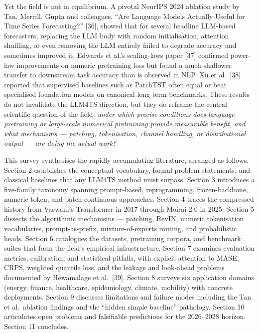 \documentclass{article}
\begin{document}
Yet the field is not in equilibrium. A pivotal NeurIPS 2024 ablation study by Tan, Merrill, Gupta and colleagues, ``Are Language Models Actually Useful for Time Series Forecasting?'' {[}36{]}, showed that for several headline LLM-based forecasters, replacing the LLM body with random initialisation, attention shuffling, or even removing the LLM entirely failed to degrade accuracy and sometimes improved it. Edwards et al.'s scaling-laws paper {[}37{]} confirmed power-law improvements on numeric pretraining loss but found a much shallower transfer to downstream task accuracy than is observed in NLP. Xu et al.~{[}38{]} reported that supervised baselines such as PatchTST often equal or beat specialised foundation models on canonical long-term benchmarks. These results do not invalidate the LLM4TS direction, but they do reframe the central scientific question of the field: \emph{under which precise conditions does language pretraining or large-scale numerical pretraining provide measurable benefit, and what mechanisms --- patching, tokenisation, channel handling, or distributional output --- are doing the actual work?}

This survey synthesises the rapidly accumulating literature, arranged as follows. Section 2 establishes the conceptual vocabulary, formal problem statements, and classical baselines that any LLM4TS method must surpass. Section 3 introduces a five-family taxonomy spanning prompt-based, reprogramming, frozen-backbone, numeric-token, and patch-continuous approaches. Section 4 traces the compressed history from Vaswani's Transformer in 2017 through Moirai 2.0 in 2025. Section 5 dissects the algorithmic mechanisms --- patching, RevIN, numeric tokenisation vocabularies, prompt-as-prefix, mixture-of-experts routing, and probabilistic heads. Section 6 catalogues the datasets, pretraining corpora, and benchmark suites that form the field's empirical infrastructure. Section 7 examines evaluation metrics, calibration, and statistical pitfalls, with explicit attention to MASE, CRPS, weighted quantile loss, and the leakage and look-ahead problems documented by Hewamalage et al.~{[}39{]}. Section 8 surveys six application domains (energy, finance, healthcare, epidemiology, climate, mobility) with concrete deployments. Section 9 discusses limitations and failure modes including the Tan et al.~ablation findings and the ``hidden simple baseline'' pathology. Section 10 articulates open problems and falsifiable predictions for the 2026--2028 horizon. Section 11 concludes.
\end{document}

